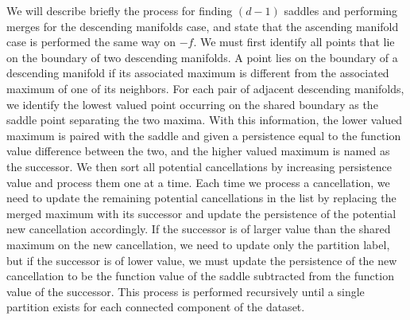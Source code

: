 We will describe briefly the process for finding $(d-1)$ saddles and performing merges for the descending manifolds case, and state that the ascending manifold case is performed the same way on $-f$.
%
We must first identify all points that lie on the boundary of two descending manifolds.
%
A point lies on the boundary of a descending manifold if its associated maximum is different from the associated maximum of one of its neighbors.
%
For each pair of adjacent descending manifolds, we identify the lowest valued point occurring on the shared boundary as the saddle point separating the two maxima.
%
With this information, the lower valued maximum is paired with the saddle and given a persistence equal to the function value difference between the two, and the higher valued maximum is named as the successor.
%
We then sort all potential cancellations by increasing persistence value and process them one at a time.
%
Each time we process a cancellation, we need to update the remaining potential cancellations in the list by replacing the merged maximum with its successor and update the persistence of the potential new cancellation accordingly.
%
If the successor is of larger value than the shared maximum on the new cancellation, we need to update only the partition label, but if the successor is of lower value, we must update the persistence of the new cancellation to be the function value of the saddle subtracted from the function value of the successor.
%
This process is performed recursively until a single partition exists for each connected component of the dataset.


